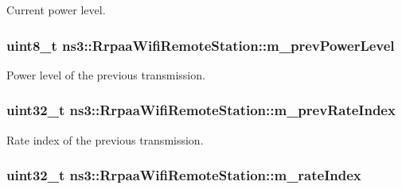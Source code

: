 Current power level. 

\subsubsection[{\texorpdfstring{m\+\_\+prev\+Power\+Level}{m_prevPowerLevel}}]{\setlength{\rightskip}{0pt plus 5cm}uint8\+\_\+t ns3\+::\+Rrpaa\+Wifi\+Remote\+Station\+::m\+\_\+prev\+Power\+Level}\hypertarget{structns3_1_1RrpaaWifiRemoteStation_a6eafe125f9b0140f4ade76c58556b831}{}\label{structns3_1_1RrpaaWifiRemoteStation_a6eafe125f9b0140f4ade76c58556b831}


Power level of the previous transmission. 

\subsubsection[{\texorpdfstring{m\+\_\+prev\+Rate\+Index}{m_prevRateIndex}}]{\setlength{\rightskip}{0pt plus 5cm}uint32\+\_\+t ns3\+::\+Rrpaa\+Wifi\+Remote\+Station\+::m\+\_\+prev\+Rate\+Index}\hypertarget{structns3_1_1RrpaaWifiRemoteStation_a4c0e4468c26422633983d7411a8b4b71}{}\label{structns3_1_1RrpaaWifiRemoteStation_a4c0e4468c26422633983d7411a8b4b71}


Rate index of the previous transmission. 

\subsubsection[{\texorpdfstring{m\+\_\+rate\+Index}{m_rateIndex}}]{\setlength{\rightskip}{0pt plus 5cm}uint32\+\_\+t ns3\+::\+Rrpaa\+Wifi\+Remote\+Station\+::m\+\_\+rate\+Index}\hypertarget{structns3_1_1RrpaaWifiRemoteStation_ad006a058d80633032d4751dada11dfa3}{}\label{structns3_1_1RrpaaWifiRemoteStation_ad006a058d80633032d4751dada11dfa3}


